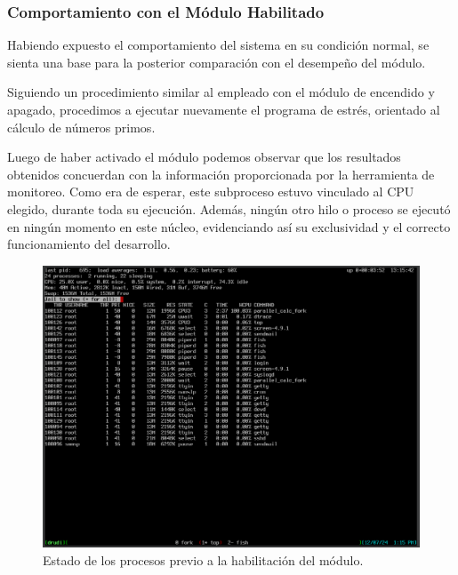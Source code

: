 \subsubsection{Comportamiento con el Módulo Habilitado}
Habiendo expuesto el comportamiento del sistema en su condición normal, se sienta una base para la posterior comparación con el desempeño del módulo.\par

Siguiendo un procedimiento similar al empleado con el módulo de encendido y apagado, procedimos a ejecutar nuevamente el programa de estrés, orientado al cálculo de números primos.\par

Luego de haber activado el módulo podemos observar que los resultados obtenidos concuerdan con la información proporcionada por la  herramienta de monitoreo. Como era de esperar, este subproceso estuvo vinculado al CPU elegido, durante toda su ejecución. Además, ningún otro hilo o proceso se ejecutó en ningún momento en este núcleo, evidenciando así su exclusividad y el correcto funcionamiento del desarrollo.\par

\begin{figure}[H]
    \centering
    \includegraphics[width=1\textwidth]{images/cpuMonopolized-idle.png}
    \caption{Estado de los procesos previo a la habilitación del módulo.}
    \label{fig:cpuMonopolized-idle}
\end{figure}

